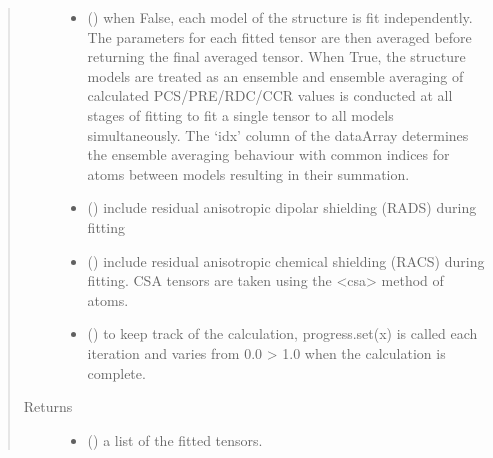 \documentclass[a4paper,10pt,english,openany,oneside]{sphinxmanual}
\begin{document}
\begin{fulllineitems}
\begin{quote}
\begin{description}
\begin{itemize}
\item {} 
\sphinxAtStartPar
{} (\sphinxstyleliteralemphasis{\sphinxupquote{, }}) \textendash{} when False, each model of the structure is fit independently.
The parameters for each fitted tensor are then averaged before
returning the final averaged tensor.
When True, the structure models are treated as an ensemble and
ensemble averaging of calculated PCS/PRE/RDC/CCR values is
conducted at all stages of fitting to fit a single tensor to all
models simultaneously. The ‘idx’ column of the dataArray
determines the ensemble averaging behaviour with common indices
for atoms between models resulting in their summation.

\item {} 
\sphinxAtStartPar
{} (\sphinxstyleliteralemphasis{\sphinxupquote{, }}) \textendash{} include residual anisotropic dipolar shielding (RADS) during fitting

\item {} 
\sphinxAtStartPar
{} (\sphinxstyleliteralemphasis{\sphinxupquote{, }}) \textendash{} include residual anisotropic chemical shielding (RACS) during fitting.
CSA tensors are taken using the \textless{}csa\textgreater{} method of atoms.

\item {} 
\sphinxAtStartPar
{} (\sphinxstyleliteralemphasis{\sphinxupquote{, }}) \textendash{} to keep track of the calculation, progress.set(x) is called each
iteration and varies from 0.0 \sphinxhyphen{}\textgreater{} 1.0 when the calculation is complete.

\end{itemize}

\item[{Returns}] \leavevmode
\sphinxAtStartPar
\begin{itemize}
\item {} 
\sphinxAtStartPar
{} () \textendash{} a list of the fitted tensors.


\end{itemize}
\end{description}
\end{quote}
\end{fulllineitems}
\end{document}
